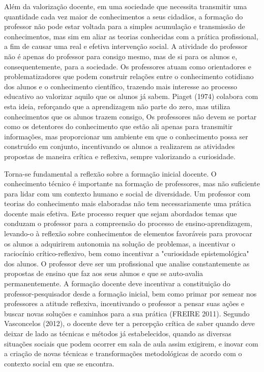     
	Além da valorização docente, em uma sociedade que necessita transmitir uma quantidade cada vez maior de conhecimentos a seus cidadãos, a formação do professor não pode estar voltada para a simples acumulação e transmissão de conhecimentos, mas sim em aliar as teorias conhecidas com a prática profissional, a fim de causar uma real e efetiva intervenção social. A atividade do professor não é apenas do professor para consigo mesmo, mas de si para os alunos e, consequentemente, para a sociedade. Os professores atuam como orientadores e problematizadores que podem construir relações entre o conhecimento cotidiano dos alunos e o conhecimento científico, trazendo mais interesse ao processo educativo ao valorizar aquilo que os alunos já sabem. Piaget (1974) colabora com esta ideia, reforçando que a aprendizagem não parte do zero, mas utiliza conhecimentos que os alunos trazem consigo, Os professores não devem se portar como os detentores do conhecimento que estão ali apenas para transmitir informações, mas proporcionar um ambiente em que o conhecimento possa ser construído em conjunto, incentivando os alunos a realizarem as atividades propostas de maneira crítica e reflexiva, sempre valorizando a curiosidade.
    
    
	Torna-se fundamental a reflexão sobre a formação inicial docente. O conhecimento técnico é importante na formação de professores, mas não suficiente para lidar com um contexto humano e social de diversidade. Um professor com teorias do conhecimento mais elaboradas não tem necessariamente uma prática docente mais efetiva. Este processo requer que sejam abordados temas que conduzam o professor para a compreensão do processo de ensino-aprendizagem, levando-o à reflexão sobre conhecimentos de elementos favoráveis para provocar os alunos a adquirirem autonomia na solução de problemas, a incentivar o raciocínio crítico-reflexivo, bem como incentivar a "curiosidade epistemológica" dos alunos. O professor deve ser um profissional que analise constantemente as propostas de ensino que faz aos seus alunos e que se auto-avalia permanentemente. A formação docente deve incentivar a constituição do professor-pesquisador desde a formação inicial, bem como primar por semear nos professores a atitude reflexiva,  incentivando o professor a pensar suas ações e buscar novas soluções e caminhos para a sua prática (FREIRE 2011). Segundo Vasconcelos (2012), o docente deve ter a percepção crítica de saber quando deve deixar de lado as técnicas e métodos já estabelecidos, quando as diversas situações sociais que podem ocorrer em sala de aula assim exigirem, e inovar com a criação de novas técnicas e transformações metodológicas de acordo com o contexto social em que se encontra.	
    
